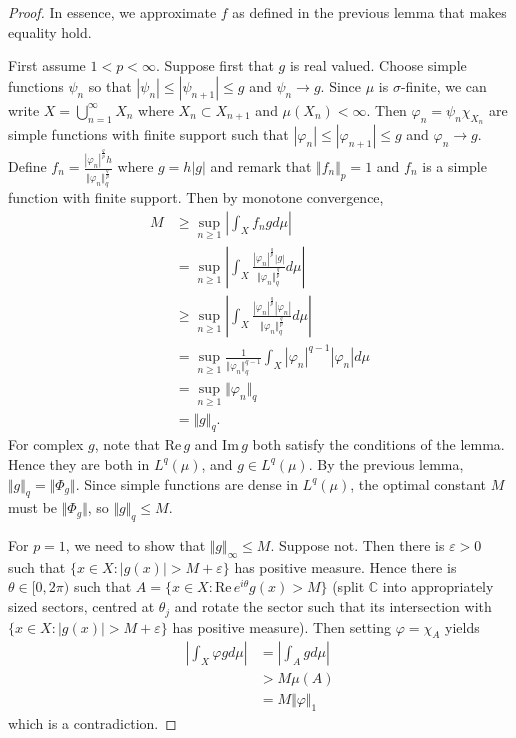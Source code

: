 \documentclass[11pt]{amsart}
\theoremstyle{definition}
\numberwithin{equation}{section}
\begin{document}
\begin{proof}
    In essence, we approximate $f$ as defined in the previous lemma that makes equality hold.
    
    First assume $1<p<\infty$. Suppose first that $g$ is real valued. Choose simple functions $\psi_n$ so that $|\psi_n|\le |\psi_{n+1}|\le g$ and $\psi_n\to g$. Since $\mu$ is $\sigma$-finite, we can write $X=\bigcup_{n=1}^\infty X_n$ where $X_n\subset X_{n+1}$ and $\mu(X_n)<\infty$. Then $\varphi_n=\psi_n\chi_{X_n}$ are simple functions with finite support such that $|\varphi_n|\le |\varphi_{n+1}|\le g$ and $\varphi_n\to g$. Define $f_n=\frac{|\varphi_n|^\frac{q}{p}h}{\Vert\varphi_n\Vert_q^\frac{q}{p}}$ where $g=h|g|$ and remark that $\Vert f_n\Vert_p=1$ and $f_n$ is a simple function with finite support. Then by monotone convergence,
    \begin{align*}
        M&\ge\sup_{n\ge 1}\left|\int_Xf_ngd\mu\right|\\
        &=\sup_{n\ge 1}\left|\int_X\frac{|\varphi_n|^\frac{q}{p}|g|}{\Vert\varphi_n\Vert_q^\frac{q}{p}}d\mu\right|\\
        &\ge\sup_{n\ge 1}\left|\int_X\frac{|\varphi_n|^\frac{q}{p}|\varphi_n|}{\Vert \varphi_n\Vert_q^\frac{q}{p}}d\mu\right|\\
        &=\sup_{n\ge 1}\frac{1}{\Vert \varphi_n\Vert_q^{q-1}}\int_X|\varphi_n|^{q-1}|\varphi_n|d\mu\\
        &=\sup_{n\ge 1}\Vert \varphi_n\Vert_q\\
        &=\Vert g\Vert_q.
    \end{align*}
    For complex $g$, note that $\mathrm{Re}\,g$ and $\mathrm{Im}\,g$ both satisfy the conditions of the lemma. Hence they are both in $L^q(\mu)$, and $g\in L^q(\mu)$. By the previous lemma, $\Vert g\Vert_q=\Vert\Phi_g\Vert$. Since simple functions are dense in $L^q(\mu)$, the optimal constant $M$ must be $\Vert\Phi_g\Vert$, so $\Vert g\Vert_q\le M$.

    For $p=1$, we need to show that $\Vert g\Vert_\infty\le M$. Suppose not. Then there is $\varepsilon>0$ such that $\{x\in X:|g(x)|>M+\varepsilon\}$ has positive measure. Hence there is $\theta\in[0,2\pi)$ such that $A=\{x\in X:\mathrm{Re}\,e^{i\theta}g(x)>M\}$ (split $\mathbb C$ into appropriately sized sectors, centred at $\theta_j$ and rotate the sector such that its intersection with $\{x\in X:|g(x)|>M+\varepsilon\}$ has positive measure). Then setting $\varphi=\chi_A$ yields
    \begin{align*}
        \left|\int_X\varphi gd\mu\right|&=\left|\int_Agd\mu\right|\\
        &>M\mu(A)\\
        &=M\Vert\varphi\Vert_1
    \end{align*}
    which is a contradiction.
\end{proof}
\end{document}
